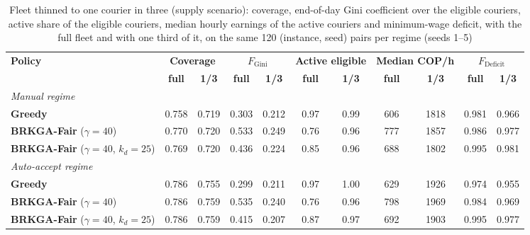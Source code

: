 \documentclass[a4paper,11pt,review,3p,authoryear]{elsarticle}
\newcommand{\FG}{F_{\text{Gini}}}
\newcommand{\FD}{F_{\text{Deficit}}}
\begin{document}
\begin{table}[htbp]
\centering
\small
\begin{adjustbox}{max width=\textwidth}
\begin{tabular}{l|cc|cc|cc|cc|cc}
\hline
\multirow{2}{*}{\textbf{Policy}} & \multicolumn{2}{c|}{\textbf{Coverage}} & \multicolumn{2}{c|}{$\FG$} & \multicolumn{2}{c|}{\textbf{Active eligible}} & \multicolumn{2}{c|}{\textbf{Median COP/h}} & \multicolumn{2}{c}{$\FD$} \\
 & \textbf{full} & \textbf{1/3} & \textbf{full} & \textbf{1/3} & \textbf{full} & \textbf{1/3} & \textbf{full} & \textbf{1/3} & \textbf{full} & \textbf{1/3} \\
\hline
\multicolumn{11}{l}{\textit{Manual regime}} \\
\textbf{Greedy} & 0.758 & 0.719 & 0.303 & 0.212 & 0.97 & 0.99 & 606 & 1818 & 0.981 & 0.966 \\
\textbf{BRKGA-Fair} ($\gamma = 40$) & 0.770 & 0.720 & 0.533 & 0.249 & 0.76 & 0.96 & 777 & 1857 & 0.986 & 0.977 \\
\textbf{BRKGA-Fair} ($\gamma = 40$, $k_d = 25$) & 0.769 & 0.720 & 0.436 & 0.224 & 0.85 & 0.96 & 688 & 1802 & 0.995 & 0.981 \\
\hline
\multicolumn{11}{l}{\textit{Auto-accept regime}} \\
\textbf{Greedy} & 0.786 & 0.755 & 0.299 & 0.211 & 0.97 & 1.00 & 629 & 1926 & 0.974 & 0.955 \\
\textbf{BRKGA-Fair} ($\gamma = 40$) & 0.786 & 0.759 & 0.535 & 0.240 & 0.76 & 0.96 & 798 & 1969 & 0.984 & 0.969 \\
\textbf{BRKGA-Fair} ($\gamma = 40$, $k_d = 25$) & 0.786 & 0.759 & 0.415 & 0.207 & 0.87 & 0.97 & 692 & 1903 & 0.995 & 0.977 \\
\hline
\end{tabular}
\end{adjustbox}
\caption{Fleet thinned to one courier in three (supply scenario): coverage, end-of-day Gini coefficient over the eligible couriers, active share of the eligible couriers, median hourly earnings of the active couriers and minimum-wage deficit, with the full fleet and with one third of it, on the same 120 (instance, seed) pairs per regime (seeds 1--5)}
\label{tab:review_thin}
\end{table}
\end{document}
